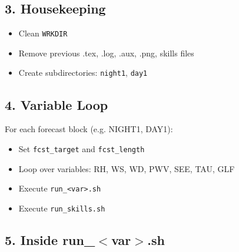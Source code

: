 \documentclass[a4paper,11pt]{article}
\begin{document}
\subsection*{3. Housekeeping}

\begin{itemize}
    \item Clean \texttt{WRKDIR}
    \item Remove previous .tex, .log, .aux, .png, skills files
    \item Create subdirectories: \texttt{night1}, \texttt{day1}
\end{itemize}

\subsection*{4. Variable Loop}

For each forecast block (e.g. NIGHT1, DAY1):

\begin{itemize}
    \item Set \texttt{fcst\_target} and \texttt{fcst\_length}
    \item Loop over variables: RH, WS, WD, PWV, SEE, TAU, GLF
    \item Execute \texttt{run\_<var>.sh}
    \item Execute \texttt{run\_skills.sh}
\end{itemize}

\subsection*{5. Inside run\_$<$var$>$.sh}
\end{document}
